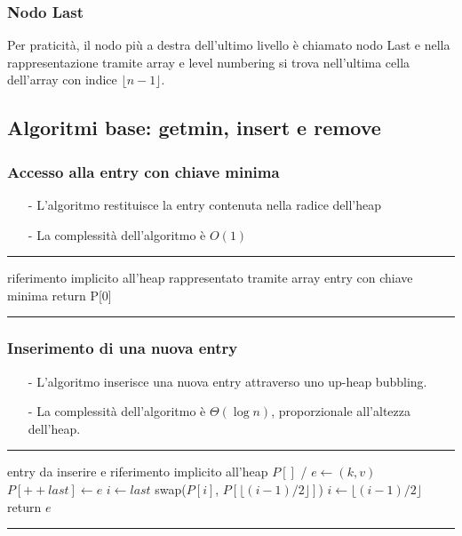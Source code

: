 \documentclass[a4paper]{article}
\makeatletter
\newenvironment{algo}[4]{
	\noindent\rule{\textwidth}{0.4pt}
	\begin{algorithmic}[1]
		\addtocounter{ALG@line}{-1}
		\Procedure{#1}{#2}
		\Require #3
		\Ensure #4
		\Statex }{
		\EndProcedure
	\end{algorithmic}
	\rule{\textwidth}{0.4pt}}
\makeatother
\begin{document}
\subsubsection*{Nodo Last}
Per praticità, il nodo più a destra dell'ultimo livello è chiamato nodo Last e nella rappresentazione tramite array e level
numbering si trova nell'ultima cella dell'array con indice \(\lfloor n-1 \rfloor\).

\newpage

\subsection{Algoritmi base: getmin, insert e remove}
\subsubsection*{Accesso alla entry con chiave minima}
\begin{itemize}[topsep=3pt, itemsep=0pt]
	\item[-] L'algoritmo restituisce la entry contenuta nella radice dell'heap
	\item[-] La complessità dell'algoritmo è \(O(1)\)
\end{itemize}
\begin{algo}{getmin}{$ $}{riferimento implicito all'heap rappresentato tramite array}{entry con chiave minima}
	\State return P[0]
\end{algo}

\subsubsection*{Inserimento di una nuova entry}
\begin{itemize}[topsep=3pt, itemsep=0pt]
	\item[-] L'algoritmo inserisce una nuova entry attraverso uno up-heap bubbling.
	\item[-] La complessità dell'algoritmo è \(\Theta(\log n)\), proporzionale all'altezza dell'heap.
\end{itemize}
\begin{algo}{insert}{$k$, $v$}{entry da inserire e riferimento implicito all'heap $P[]$}{/}
	\State $e \gets (k,v)$
	\State $P[++last] \gets e$
	\State $i \gets last$
	 
		\State swap($P[i]$, $P[\lfloor (i-1)/2\rfloor]$)
		\State $i \gets \lfloor (i-1)/2\rfloor$
	\EndWhile
	\State return $e$
\end{algo}
\end{document}
